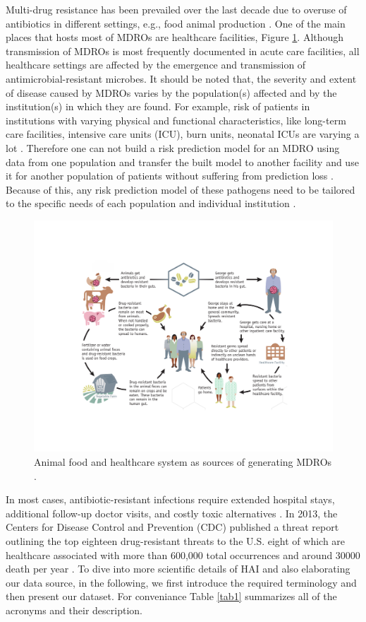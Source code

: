 Multi-drug resistance has been prevailed over the last decade due to overuse of antibiotics in different settings, e.g., food animal production \cite{landers2012review}. One of the main places that hosts most of MDROs are healthcare facilities, Figure \ref{resistant}. Although transmission of MDROs is most frequently documented in acute care facilities, all healthcare settings are affected by the emergence and transmission of antimicrobial-resistant microbes. It should be noted that, the severity and extent of disease caused by MDROs varies by the population(s) affected and by the institution(s) in which they are found. For example, risk of patients in institutions with varying physical and functional characteristics, like long-term care facilities, intensive care units (ICU), burn units, neonatal ICUs are varying a lot \cite{siegel2007management}. Therefore one can not build a risk prediction model for an MDRO using data from one population and transfer the built model to another facility and use it for another population of patients without suffering from prediction loss \cite{wiens2014study}. Because of this, any risk prediction model of these pathogens need to be tailored to the specific needs of each population and individual institution \cite{siegel2007management, wiens2014study}. 

\begin{figure}
	\centering
	\includegraphics[width=.7\textwidth]{./img/resistant.pdf}
	\caption{Animal food and healthcare system as sources of generating MDROs \cite{resistance}.}
	\label{resistant}
\end{figure}

In most cases, antibiotic-resistant infections require extended hospital stays, additional follow-up doctor visits, and costly toxic alternatives \cite{amr, resistance}. In 2013, the Centers for Disease Control and Prevention (CDC) published a threat report outlining the top eighteen drug-resistant threats to the U.S. eight of which are healthcare associated with more than 600,000 total occurrences and around 30000 death per year \cite{resistance}. To dive into more scientific details of HAI and also elaborating our data source, in the following, we first introduce the required terminology and then present our dataset. For conveniance Table \ref{tab1} summarizes all of the acronyms and their description. 

